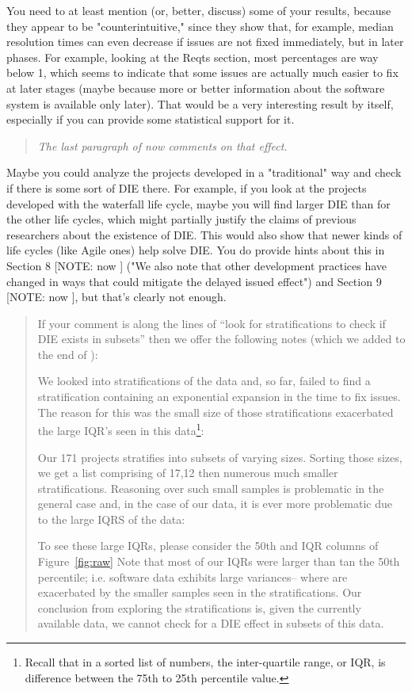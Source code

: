 You need to at least mention (or, better, discuss) some of
your results, because they appear to be "counterintuitive,"
since they show that, for example, median resolution times
can even decrease if issues are not fixed immediately, but
in later phases. For example, looking at the Reqts section,
most percentages are way below 1, which seems to indicate
that some issues are actually much easier to fix at later
stages (maybe because more or better information about the
software system is available only later). That would be a
very interesting result by itself, especially if you can
provide some statistical support for it.
\begin{quote}{\em
The last paragraph of  now comments
on that effect. }
\end{quote}
 

Maybe you could analyze the projects developed in a
"traditional" way and check if there is some sort of DIE
there. For example, if you look at the projects developed
with the waterfall life cycle, maybe you will find larger
DIE than for the other life cycles, which might partially
justify the claims of previous researchers about the
existence of DIE. This would also show that newer kinds of
life cycles (like Agile ones) help solve DIE. You do provide
hints about this in Section 8 [NOTE: now ] ("We also note that other
development practices have changed in ways that could
mitigate the delayed issued effect") and Section 9 [NOTE: now ], but
that's clearly not enough.
\begin{quote}{\em

If your comment is along the lines of ``look for stratifications to check if
DIE exists in subsets'' then we offer the following notes (which we added to the end of ):

We looked into   stratifications of the data and, so far,   failed to find a stratification
containing an exponential expansion in the time to fix issues. The reason for this was  the small size
of those stratifications  exacerbated the large IQR's seen in this data\footnote{Recall that in a sorted list of numbers,
the inter-quartile range, or IQR, is difference between the 
  75th to 25th percentile value.}:
\bi
\item
Our 171 projects   stratifies into subsets of varying sizes. Sorting those sizes, we get a list
comprising of 17,12 then numerous much smaller stratifications.  Reasoning over such small samples
is problematic in the general case and, in the case of our data, it is ever more problematic due to
the large IQRS of the data:
\item
To see these large IQRs,  please consider the 50th and IQR columns of Figure~\ref{fig:raw} Note that most of our IQRs were larger than tan the 50th percentile; i.e. software
data exhibits large variances-- where are exacerbated by the smaller samples seen in the stratifications.
\ei
Our conclusion from exploring the stratifications is, given the currently available data, we cannot check
for a DIE effect in subsets of this data.
}
\end{quote}
